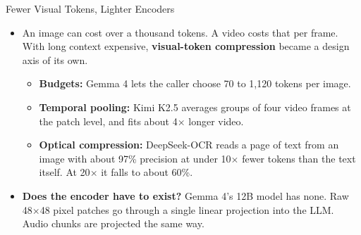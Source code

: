 \begin{frame}{Fewer Visual Tokens, Lighter Encoders}
    \begin{itemize}\itemsep0.55em
        \item An image can cost over a thousand tokens. A video costs that per frame. With long context expensive, \textbf{visual-token compression} became a design axis of its own.
        \begin{itemize}\itemsep0.25em
            \item \textbf{Budgets:} Gemma 4 lets the caller choose 70 to 1,120 tokens per image.
            \item \textbf{Temporal pooling:} Kimi K2.5 averages groups of four video frames at the patch level, and fits about 4$\times$ longer video.
            \item \textbf{Optical compression:} DeepSeek-OCR reads a page of text from an image with about 97\% precision at under 10$\times$ fewer tokens than the text itself. At 20$\times$ it falls to about 60\%.
        \end{itemize}
        \item \textbf{Does the encoder have to exist?} Gemma 4's 12B model has none. Raw 48$\times$48 pixel patches go through a single linear projection into the LLM. Audio chunks are projected the same way.
    \end{itemize}
    \vspace{0.2em}
\end{frame}

